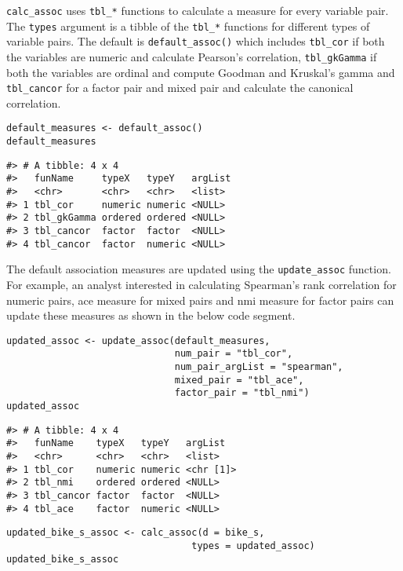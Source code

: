 \texttt{calc\_assoc} uses \texttt{tbl\_*} functions to calculate a measure for every variable pair. The \texttt{types} argument is a tibble of the \texttt{tbl\_*} functions for different types of variable pairs. The default is \texttt{default\_assoc()} which includes \texttt{tbl\_cor} if both the variables are numeric and calculate Pearson's correlation, \texttt{tbl\_gkGamma} if both the variables are ordinal and compute Goodman and Kruskal's gamma and \texttt{tbl\_cancor} for a factor pair and mixed pair and calculate the canonical correlation.

\begin{verbatim}
default_measures <- default_assoc()
default_measures
\end{verbatim}

\begin{verbatim}
#> # A tibble: 4 x 4
#>   funName     typeX   typeY   argList
#>   <chr>       <chr>   <chr>   <list> 
#> 1 tbl_cor     numeric numeric <NULL> 
#> 2 tbl_gkGamma ordered ordered <NULL> 
#> 3 tbl_cancor  factor  factor  <NULL> 
#> 4 tbl_cancor  factor  numeric <NULL>
\end{verbatim}

The default association measures are updated using the \texttt{update\_assoc} function. For example, an analyst interested in calculating Spearman's rank correlation for numeric pairs, ace measure for mixed pairs and nmi measure for factor pairs can update these measures as shown in the below code segment.

\begin{verbatim}
updated_assoc <- update_assoc(default_measures,
                              num_pair = "tbl_cor",
                              num_pair_argList = "spearman",
                              mixed_pair = "tbl_ace",
                              factor_pair = "tbl_nmi")
updated_assoc
\end{verbatim}

\begin{verbatim}
#> # A tibble: 4 x 4
#>   funName    typeX   typeY   argList  
#>   <chr>      <chr>   <chr>   <list>   
#> 1 tbl_cor    numeric numeric <chr [1]>
#> 2 tbl_nmi    ordered ordered <NULL>   
#> 3 tbl_cancor factor  factor  <NULL>   
#> 4 tbl_ace    factor  numeric <NULL>
\end{verbatim}

\begin{verbatim}
updated_bike_s_assoc <- calc_assoc(d = bike_s, 
                                 types = updated_assoc)
updated_bike_s_assoc
\end{verbatim}

